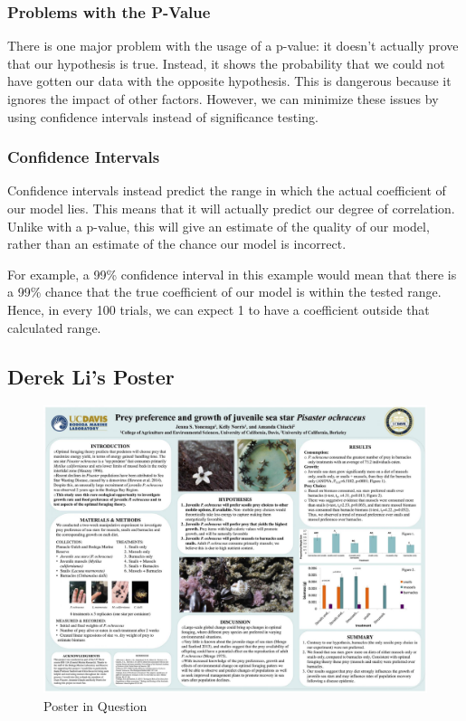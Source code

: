 \documentclass[12pt]{article}
\begin{document}
\subsubsection{Problems with the P-Value}
There is one major problem with the usage of a p-value: it doesn't actually prove that our hypothesis is true. Instead, it shows the probability that we could not have gotten our data with the opposite hypothesis. This is dangerous because it ignores the impact of other factors. However, we can minimize these issues by using confidence intervals instead of significance testing.

\subsubsection{Confidence Intervals}
Confidence intervals instead predict the range in which the actual coefficient of our model lies. This means that it will actually predict our degree of correlation. Unlike with a p-value, this will give an estimate of the quality of our model, rather than an estimate of the chance our model is incorrect.

For example, a 99\% confidence interval in this example would mean that there is a 99\% chance that the true coefficient of our model is within the tested range. Hence, in every 100 trials, we can expect 1 to have a coefficient outside that calculated range.

\newpage
\subsection{Derek Li's Poster}
\begin{figure}
	\centering
  	\includegraphics[width=150mm]{poster1.jpg}
 	\caption{Poster in Question}
 	\label{fig:derek_poster}
\end{figure}
\end{document}
